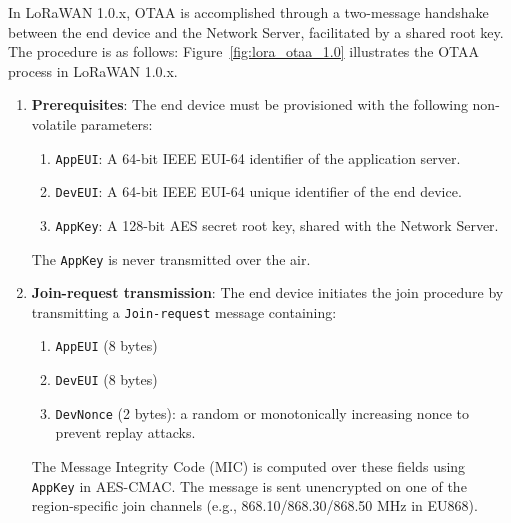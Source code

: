 In LoRaWAN 1.0.x, OTAA is accomplished through a two-message handshake between the end device and the Network Server, facilitated by a shared root key. The procedure is as follows:
Figure~\ref{fig:lora_otaa_1.0} illustrates the OTAA process in LoRaWAN 1.0.x.

\begin{enumerate}
    \item \textbf{Prerequisites}: The end device must be provisioned with the following non-volatile parameters:
          \begin{enumerate}
              \item \texttt{AppEUI}: A 64-bit IEEE EUI-64 identifier of the application server.
              \item \texttt{DevEUI}: A 64-bit IEEE EUI-64 unique identifier of the end device.
              \item \texttt{AppKey}: A 128-bit AES secret root key, shared with the Network Server.
          \end{enumerate}
          The \texttt{AppKey} is never transmitted over the air.

    \item \textbf{Join-request transmission}: The end device initiates the join procedure by transmitting a \texttt{Join-request} message containing:
          \begin{enumerate}
              \item \texttt{AppEUI} (8 bytes)
              \item \texttt{DevEUI} (8 bytes)
              \item \texttt{DevNonce} (2 bytes): a random or monotonically increasing nonce to prevent replay attacks.
          \end{enumerate}
          The Message Integrity Code (MIC) is computed over these fields using \texttt{AppKey} in AES-CMAC. The message is sent unencrypted on one of the region-specific join channels (e.g., 868.10/868.30/868.50 MHz in EU868).


\end{enumerate}
